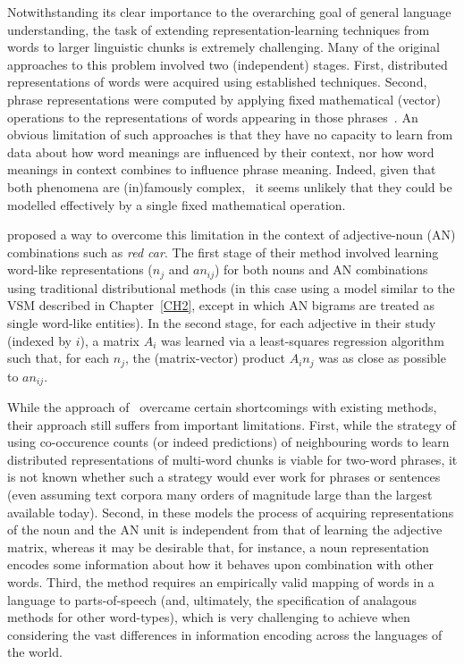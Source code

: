\label{CH4}

Notwithstanding its clear importance to the overarching goal of general language understanding, the task of extending representation-learning techniques from words to larger linguistic chunks is extremely challenging. Many of the original approaches to this problem involved two (independent) stages. First, distributed representations of words were acquired using established techniques. Second, phrase representations were computed by applying fixed mathematical (vector) operations to the representations of words appearing in those phrases~\citep{clark2007combining,mitchell2008vector,baroni2014frege}. An obvious limitation of such approaches is that they have no capacity to learn from data about how word meanings are influenced by their context, nor how word meanings in context combines to influence phrase meaning. Indeed, given that both phenomena are (in)famously complex,~\citep{prinz2004furnishing,fodor2004having,fauconnier1994mental} it seems unlikely that they could be modelled effectively by a single fixed mathematical operation.  

\cite{baroni2010nouns} proposed a way to overcome this limitation in the context of adjective-noun (AN) combinations such as \emph{red car}. The first stage of their method involved learning word-like representations (\(n_j\) and \(an_{ij}\)) for both nouns and AN combinations using traditional distributional methods (in this case using a model similar to the VSM described in Chapter~\ref{CH2}, except in which AN bigrams are treated as single word-like entities). In the second stage, for each adjective in their study (indexed by \(i\)), a matrix \(A_i\) was learned via a least-squares regression algorithm such that, for each \(n_j\), the (matrix-vector) product \(A_i n_j\) was as close as possible to \(an_{ij}\).

While the approach of~\cite{baroni2010nouns} overcame certain shortcomings with existing methods, their approach still suffers from important limitations. First, while the strategy of using co-occurence counts (or indeed predictions) of neighbouring words to learn distributed representations of multi-word chunks is viable for two-word phrases, it is not known whether such a strategy would ever work for phrases or sentences (even assuming text corpora many orders of magnitude large than the largest available today). Second, in these models the process of acquiring representations of the noun and the AN unit is independent from that of learning the adjective matrix, whereas it may be desirable that, for instance, a noun representation encodes some information about how it behaves upon combination with other words. Third, the method requires an empirically valid mapping of words in a language to parts-of-speech (and, ultimately, the specification of analagous methods for other word-types), which is very challenging to achieve when considering the vast differences in information encoding across the languages of the world. 

